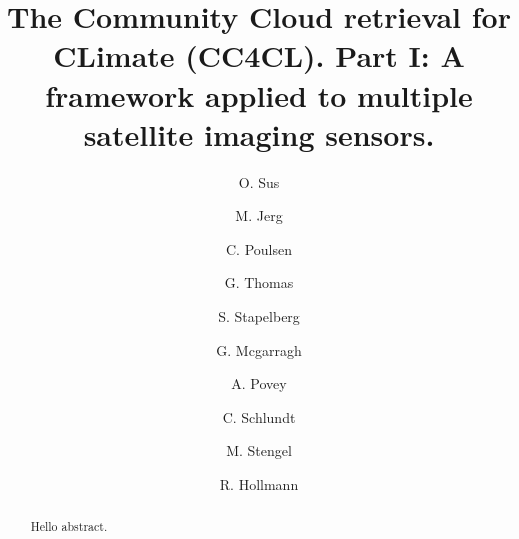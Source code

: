 \documentclass[amt]{style/copernicus}
\begin{document}
\linenumbers

\title{The Community Cloud retrieval for CLimate (CC4CL). Part I: A
  framework applied to multiple satellite imaging sensors.}

\author[1]{O. Sus}
\author[1]{M. Jerg}
\author[2]{C. Poulsen}
\author[2]{G. Thomas}
\author[1]{S. Stapelberg}
\author[3]{G. Mcgarragh}
\author[3]{A. Povey}
\author[1]{C. Schlundt}
\author[1]{M. Stengel}
\author[1]{R. Hollmann}





\received{}
\pubdiscuss{} %
\revised{}
\accepted{}
\published{}


\maketitle  

\begin{abstract}
Hello abstract.
\end{abstract}













\appendix
\end{document}
